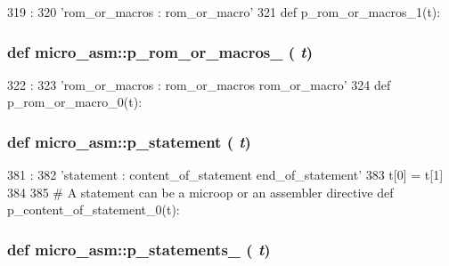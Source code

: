 \begin{DoxyCode}
319                         :
320     'rom_or_macros : rom_or_macro'
321 
def p_rom_or_macros_1(t):
\end{DoxyCode}
\hypertarget{namespacemicro__asm_a98a28e21d8935d0509b0eeab16cb1054}{
\subsubsection[{p\_\-rom\_\-or\_\-macros\_\-1}]{\setlength{\rightskip}{0pt plus 5cm}def micro\_\-asm::p\_\-rom\_\-or\_\-macros\_ ( {\em t})}}
\label{namespacemicro__asm_a98a28e21d8935d0509b0eeab16cb1054}



\begin{DoxyCode}
322                         :
323     'rom_or_macros : rom_or_macros rom_or_macro'
324 
def p_rom_or_macro_0(t):
\end{DoxyCode}
\hypertarget{namespacemicro__asm_aa6bc8ecb9428878bec6bcc95b1cb0f4c}{
\subsubsection[{p\_\-statement}]{\setlength{\rightskip}{0pt plus 5cm}def micro\_\-asm::p\_\-statement ( {\em t})}}
\label{namespacemicro__asm_aa6bc8ecb9428878bec6bcc95b1cb0f4c}



\begin{DoxyCode}
381                   :
382     'statement : content_of_statement end_of_statement'
383     t[0] = t[1]
384 
385 # A statement can be a microop or an assembler directive
def p_content_of_statement_0(t):
\end{DoxyCode}
\hypertarget{namespacemicro__asm_a6cd716f332ee4919811fe6ade94e75c5}{
\subsubsection[{p\_\-statements\_\-0}]{\setlength{\rightskip}{0pt plus 5cm}def micro\_\-asm::p\_\-statements\_ ( {\em t})}}
\label{namespacemicro__asm_a6cd716f332ee4919811fe6ade94e75c5}




